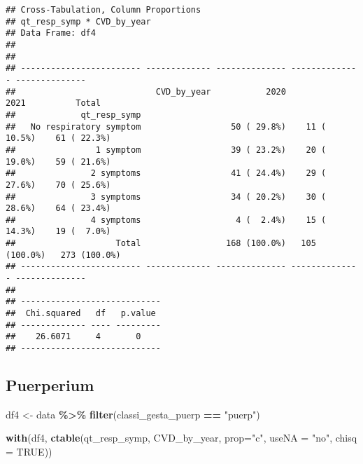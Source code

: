 \documentclass[
]{article}
\newenvironment{Shaded}{\begin{snugshade}}{\end{snugshade}}
\newcommand{\AttributeTok}[1]{\textcolor[rgb]{0.13,0.29,0.53}{#1}}
\newcommand{\ConstantTok}[1]{\textcolor[rgb]{0.56,0.35,0.01}{#1}}
\newcommand{\FunctionTok}[1]{\textcolor[rgb]{0.13,0.29,0.53}{\textbf{#1}}}
\newcommand{\NormalTok}[1]{#1}
\newcommand{\OtherTok}[1]{\textcolor[rgb]{0.56,0.35,0.01}{#1}}
\newcommand{\SpecialCharTok}[1]{\textcolor[rgb]{0.81,0.36,0.00}{\textbf{#1}}}
\newcommand{\StringTok}[1]{\textcolor[rgb]{0.31,0.60,0.02}{#1}}
\begin{document}
\begin{verbatim}
## Cross-Tabulation, Column Proportions  
## qt_resp_symp * CVD_by_year  
## Data Frame: df4  
## 
## 
## ------------------------ ------------- -------------- -------------- --------------
##                            CVD_by_year           2020           2021          Total
##             qt_resp_symp                                                           
##   No respiratory symptom                  50 ( 29.8%)    11 ( 10.5%)    61 ( 22.3%)
##                1 symptom                  39 ( 23.2%)    20 ( 19.0%)    59 ( 21.6%)
##               2 symptoms                  41 ( 24.4%)    29 ( 27.6%)    70 ( 25.6%)
##               3 symptoms                  34 ( 20.2%)    30 ( 28.6%)    64 ( 23.4%)
##               4 symptoms                   4 (  2.4%)    15 ( 14.3%)    19 (  7.0%)
##                    Total                 168 (100.0%)   105 (100.0%)   273 (100.0%)
## ------------------------ ------------- -------------- -------------- --------------
## 
## ----------------------------
##  Chi.squared   df   p.value 
## ------------- ---- ---------
##    26.6071     4       0    
## ----------------------------
\end{verbatim}

\hypertarget{puerperium-4}{%
\subsection{Puerperium}\label{puerperium-4}}

\begin{Shaded}
\begin{Highlighting}[]
\NormalTok{df4 }\OtherTok{\textless{}{-}}\NormalTok{ data }\SpecialCharTok{\%\textgreater{}\%} 
  \FunctionTok{filter}\NormalTok{(classi\_gesta\_puerp }\SpecialCharTok{==} \StringTok{"puerp"}\NormalTok{)}

\FunctionTok{with}\NormalTok{(df4, }\FunctionTok{ctable}\NormalTok{(qt\_resp\_symp, CVD\_by\_year, }\AttributeTok{prop=}\StringTok{"c"}\NormalTok{, }\AttributeTok{useNA =} \StringTok{"no"}\NormalTok{, }\AttributeTok{chisq =} \ConstantTok{TRUE}\NormalTok{))}
\end{Highlighting}
\end{Shaded}
\end{document}
